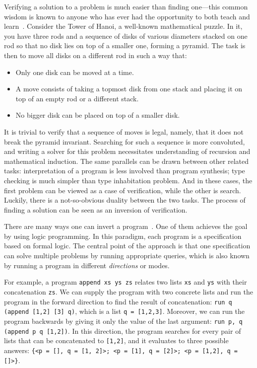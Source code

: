 \documentclass[crop=false]{standalone}
\begin{document}
Verifying a solution to a problem is much easier than finding one---this common wisdom is known to anyone who has ever had the opportunity to both teach and learn~\cite{lozov2019relational}. 
Consider the Tower of Hanoi, a well-known mathematical puzzle. 
In it, you have three rods and a sequence of disks of various diameters stacked on one rod so that no disk lies on top of a smaller one, forming a pyramid.
The task is then to move all disks on a different rod in such a way that: 
\begin{itemize}
    \item Only one disk can be moved at a time.
    \item A move consists of taking a topmost disk from one stack and placing it on top of an empty rod or a different stack.
    \item No bigger disk can be placed on top of a smaller disk. 
\end{itemize}

It is trivial to verify that a sequence of moves is legal, namely, that it does not break the pyramid invariant. 
Searching for such a sequence is more convoluted, and writing a solver for this problem necessitates understanding of recursion and mathematical induction. 
The same parallels can be drawn between other related tasks: interpretation of a program  is less involved than program synthesis; type checking is much simpler than type inhabitation problem.  
And in these cases, the first problem can be viewed as a case of verification, while the other is search. 
Luckily, there is a not-so-obvious duality between the two tasks.
The process of finding a solution can be seen as an inversion of verification.

There are many ways one can invert a program~\cite{SemanticsModifiers1,RevURA,aman2020foundations}. 
One of them achieves the goal by using logic programming. 
In this paradigm, each program is a specification based on formal logic. 
The central point of the approach is that one specification can solve multiple problems by running appropriate queries, which is also known by running a program in different \emph{directions} or modes. 

For example, a program \texttt{append xs ys zs} relates two lists \texttt{xs} and \texttt{ys} with their concatenation \texttt{zs}. 
We can supply the program with two concrete lists and run the program in the forward direction to find the result of concatenation: \texttt{run q (append [1,2] [3] q)}, which is a list \texttt{q = [1,2,3]}. 
Moreover, we can run the program backwards by giving it only the value of the last argument: \texttt{run p, q (append p q [1,2])}.
In this direction, the program searches for every pair of lists that can be concatenated to \texttt{[1,2]}, and it evaluates to three possible answers: \texttt{\{<p = [], q = [1, 2]>; <p = [1], q = [2]>; <p = [1,2], q = []>\}}. 
\end{document}
